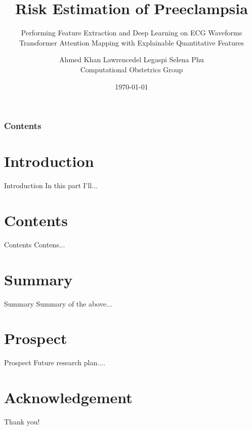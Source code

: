 \documentclass[10pt]{beamer}
\title[Risk Estimation of Preeclampsia]{Risk Estimation of Preeclampsia}
\subtitle[Performing Feature Extraction and Deep Learning on ECG Waveforms \\ Transformer Attention Mapping with Explainable Quantitative Features]{Performing Feature Extraction and Deep Learning on ECG Waveforms \\ Transformer Attention Mapping with Explainable Quantitative Features}
\author[Computational Obstetrics Group]{Ahmed Khan \hspace{1.2em} Lawrencedel Legaspi \hspace{1.2em} Selena Phu\\[0.5em] \small Computational Obstetrics Group}%
\institute[UC Davis]{UC Davis}
\date[\textcolor{white}{\today} ]
{\today}
\begin{document}
\frame{\titlepage}
\begin{frame}
\frametitle{Contents}
\tableofcontents
\end{frame}
\section{Introduction}
    \begin{frame}{Introduction}
 In this part I'll...
    \end{frame}

\section{Contents}
\begin{frame}{Contents}
	Contens...
\end{frame}



\section{Summary}
    \begin{frame}{Summary}
 Summary of the above...
    \end{frame}


\section{Prospect}
\begin{frame}{Prospect}
	Future research plan....
\end{frame}

\section*{Acknowledgement}
\begin{frame}
\textcolor{myNewColorA}{\Huge{\centerline{Thank you!}}}
\end{frame}
\end{document}
